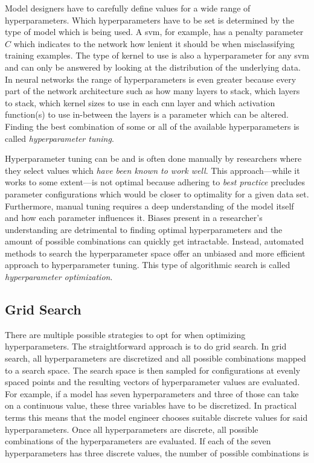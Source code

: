 \documentclass[draft,final]{vutinfth} %
\begin{document}
Model designers have to carefully define values for a wide range of
hyperparameters. Which hyperparameters have to be set is determined by
the type of model which is being used. A \gls{svm}, for example, has a
penalty parameter $C$ which indicates to the network how lenient it
should be when misclassifying training examples. The type of kernel to
use is also a hyperparameter for any \gls{svm} and can only be
answered by looking at the distribution of the underlying data. In
neural networks the range of hyperparameters is even greater because
every part of the network architecture such as how many layers to
stack, which layers to stack, which kernel sizes to use in each
\gls{cnn} layer and which activation function(s) to use in-between the
layers is a parameter which can be altered. Finding the best
combination of some or all of the available hyperparameters is called
\emph{hyperparameter tuning}.

Hyperparameter tuning can be and is often done manually by researchers
where they select values which \emph{have been known to work
well}. This approach—while it works to some extent—is not optimal
because adhering to \emph{best practice} precludes parameter
configurations which would be closer to optimality for a given data
set. Furthermore, manual tuning requires a deep understanding of the
model itself and how each parameter influences it. Biases present in a
researcher's understanding are detrimental to finding optimal
hyperparameters and the amount of possible combinations can quickly
get intractable. Instead, automated methods to search the
hyperparameter space offer an unbiased and more efficient approach to
hyperparameter tuning. This type of algorithmic search is called
\emph{hyperparameter optimization}.

\subsection{Grid Search}
\label{ssec:grid-search}

There are multiple possible strategies to opt for when optimizing
hyperparameters. The straightforward approach is to do grid search. In
grid search, all hyperparameters are discretized and all possible
combinations mapped to a search space. The search space is then
sampled for configurations at evenly spaced points and the resulting
vectors of hyperparameter values are evaluated. For example, if a
model has seven hyperparameters and three of those can take on a
continuous value, these three variables have to be discretized. In
practical terms this means that the model engineer chooses suitable
discrete values for said hyperparameters. Once all hyperparameters are
discrete, all possible combinations of the hyperparameters are
evaluated. If each of the seven hyperparameters has three discrete
values, the number of possible combinations is
\end{document}
